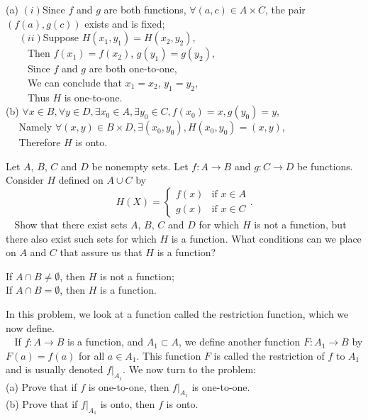 \documentclass[11pt, a4paper, UTF8]{ctexart}
\begin{document}
\begin{solution}
  (a) $(i)$Since $f$ and $g$ are both functions, $\forall (a,c) \in A \times C$, 
  the pair $(f(a),g(c))$ exists and is fixed;\\
  $~~~~~~(ii)$Suppose $H(x_{1},y_{1}) = H(x_{2},y_{2})$,\\
  $~~~~~~~~~~$Then $f(x_{1}) = f(x_{2})$, $g(y_{1}) = g(y_{2})$,\\
  $~~~~~~~~~~$Since $f$ and $g$ are both one-to-one,\\
  $~~~~~~~~~~$We can conclude that $x_{1} = x_{2}$, $y_{1} = y_{2}$,\\
  $~~~~~~~~~~$Thus $H$ is one-to-one.\\
  (b) $\forall x \in B, \forall y \in D, \exists x_{0} \in A, \exists y_{0} \in C, 
  f(x_{0}) = x, g(y_{0}) = y$,\\
  $~~~~~~$Namely $\forall (x,y) \in B \times D, \exists (x_{0},y_{0}), 
  H(x_{0},y_{0}) = (x, y)$,\\
  $~~~~~~$Therefore $H$ is onto.
\end{solution}

\begin{problem}[UD: 15.15]
  Let $A$, $B$, $C$ and $D$ be nonempty sets. Let $f:A \rightarrow B$ and $g:C \rightarrow D$ 
  be functions. Consider $H$ defined on $A \cup C$ by
  $$H(X) = 
    \begin{cases}
      f(x)& \text{if $x \in A$}\\
      g(x)& \text{if $x \in C$}
    \end{cases}.$$
  $~~~~$Show that there exist sets $A$, $B$, $C$ and $D$ for which $H$ is not a 
  function, but there also exist such sets for which $H$ is a function. What conditions 
  can we place on $A$ and $C$ that assure us that $H$ is a function?
\end{problem}

\begin{solution}
  If $A \cap B \neq \emptyset$, then $H$ is not a function;\\
  If $A \cap B = \emptyset$, then $H$ is a function.
\end{solution}

\begin{problem}[UD: 15.20]
  In this problem, we look at a function called the restriction function, which we 
  now define.\\
  $~~~~$If $f:A \rightarrow B$ is a function, and $A_{1} \subset A$, we define another 
  function $F:A_{1} \rightarrow B$ by $F(a) = f(a)$ for all $a \in A_{1}$. This 
  function $F$ is called the restriction of $f$ to $A_{1}$ and is usually denoted $f|_{A_{1}}$. 
  We now turn to the problem:\\
  (a) Prove that if $f$ is one-to-one, then $f|_{A_{1}}$ is one-to-one.\\
  (b) Prove that if $f|_{A_{1}}$ is onto, then $f$ is onto.
\end{problem}
\end{document}
